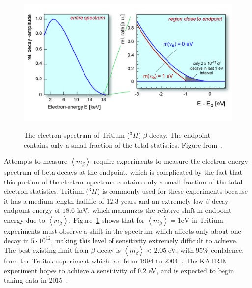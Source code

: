 \begin{figure}
\begin{center}
\includegraphics[keepaspectratio=true,width=\textwidth]{TritiumSpectrum.jpg}
\end{center}
\renewcommand{\baselinestretch}{1}
\small\normalsize
\begin{quote}
\caption{The electron spectrum of Tritium ($^3H$) $\beta$ decay.  The endpoint contains only a small fraction of the total statistics.  Figure from~\cite{Angrik:2005ep}.}
\label{fig:TritiumSpectrum}
\end{quote}
\end{figure}
\renewcommand{\baselinestretch}{2}
\small\normalsize

Attempts to measure $\left< m_\beta \right>$ require experiments to measure the electron energy spectrum of beta decays at the endpoint, which is complicated by the fact that this portion of the electron spectrum contains only a small fraction of the total electron statistics.  Tritium ($^3H$) is commonly used for these experiments because it has a medium-length halflife of $12.3$ years and an extremely low $\beta$ decay endpoint energy of $18.6$ keV, which maximizes the relative shift in endpoint energy due to $\left< m_\beta \right>$.  Figure~\ref{fig:TritiumSpectrum} shows that for $\left< m_\beta \right> = 1\text{eV}$ in Tritium, experiments must observe a shift in the spectrum which affects only about one decay in $5 \cdot 10^{12}$, making this level of sensitivity extremely difficult to achieve.  The best existing limit from $\beta$ decay is $\left<m_\beta\right> < 2.05$ eV, with $95\%$ confidence, from the Troitsk experiment which ran from 1994 to 2004~\cite{OldTritium}.  The KATRIN experiment hopes to achieve a sensitivity of $0.2$ eV, and is expected to begin taking data in 2015~\cite{NewTritium,NewTritiumTimeline}.

